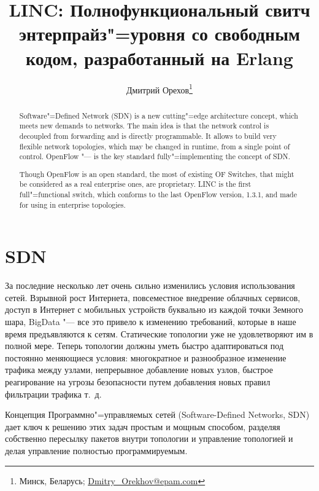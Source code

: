 \documentclass[10pt, a5paper]{article}
\begin{document}
\title{LINC: Полнофункциональный свитч энтерпрайз"=уровня со свободным кодом, разработанный на Erlang}%

\author{Дмитрий Орехов\footnote{Минск, Беларусь; \url{Dmitry_Orekhov@epam.com}}}
\maketitle

\begin{abstract}
Software"=Defined Network (SDN) is a new cutting"=edge \linebreak architecture concept, which meets new demands to networks. The main idea is that the network control is decoupled from forwarding and is directly programmable. It allows to build very flexible network topologies, which may be changed in runtime, from a single point of control. OpenFlow "--- is the key standard fully"=implementing the concept of SDN. 

Though OpenFlow is an open standard, the most of existing OF Switches, that might be considered as a real enterprise ones, are proprietary. LINC is the first full"=functional switch, which conforms to the last OpenFlow version, 1.3.1, and made for using in enterprise topologies.
\end{abstract}

\section*{SDN}

За последние несколько лет очень сильно изменились условия использования сетей. Взрывной рост Интернета, повсеместное внедрение облачных сервисов, доступ в Интернет с мобильных устройств буквально из каждой точки Земного шара, BigData "--- все это привело к изменению требований, которые в наше время предъявляются к сетям. Статические топологии уже не удовлетворяют им в полной мере. Теперь топологии должны уметь быстро адаптироваться под постоянно меняющиеся условия: многократное и разнообразное изменение трафика между узлами, непрерывное добавление новых узлов, быстрое реагирование на угрозы безопасности путем добавления новых правил фильтрации трафика т.~д.

Концепция Программно"=управляемых сетей (Software-Defined \linebreak Networks, SDN) \cite{Orekhov1} дает ключ к решению этих задач простым и мощным способом, разделяя собственно пересылку пакетов внутри топологии и управление топологией и делая управление полностью программируемым.
\end{document}

